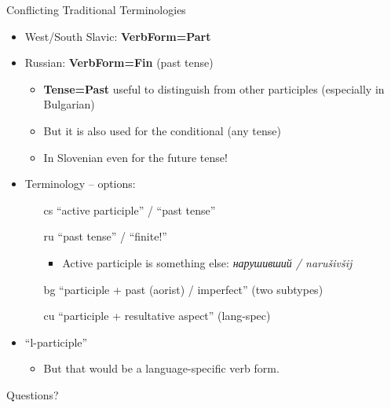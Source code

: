 \documentclass[10pt, compress, aspectratio=169]{beamer}
\newcommand{\feat}[1]{\textbf{\footnotesize\color{red}#1}}
\begin{document}
\begin{frame}{Conflicting Traditional Terminologies}
\begin{itemize}
\item West/South Slavic: \textbf{\feat{VerbForm=Part}}
\item Russian: \feat{VerbForm=Fin} (past tense)
  \begin{itemize}
  \item \textbf{\feat{Tense=Past}} useful to distinguish from other participles (especially in Bulgarian)
  \item But it is also used for the conditional (any tense)
  \item In Slovenian even for the future tense!
  \end{itemize}
\item<2-> Terminology -- options:
\begin{itemize}
\item [cs] ``active participle'' / ``past tense''
\item [ru] ``past tense'' / ``finite!''
  \begin{itemize}
  \item Active participle is something else: \textit{нарушивший / narušivšij}
  \end{itemize}
\item [bg] ``participle + past (aorist) / imperfect'' (two subtypes)
\item [cu] ``participle + resultative aspect'' (lang-spec)
\end{itemize}
\bigskip
\item<3-> ``l-participle''
  \begin{itemize}
  \item But that would be a language-specific verb form.
  \end{itemize}
\end{itemize}
\end{frame}
\fi



\begin{frame}
  \centering\Huge Questions?
\end{frame}
\end{document}
